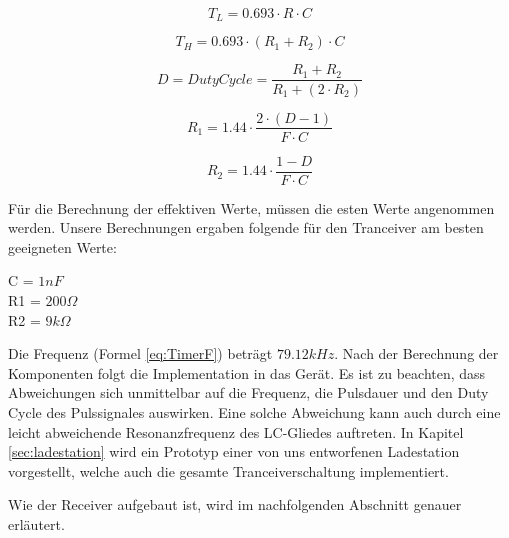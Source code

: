 \begin{equation}\label{eq:TimerTL}
T_{L}= 0.693\cdot R\cdot C
\end{equation}

\begin{equation}\label{eq:TimerTH}
T_{H}= 0.693\cdot (R_{1}+R_{2})\cdot C
\end{equation}

\begin{equation}\label{eq:TimerD}
D= Duty Cycle= \dfrac{R_{1}+R_{2}}{R_{1}+(2\cdot R_{2})}
\end{equation}

\begin{equation}\label{eq:TimerR1}
R_{1}= 1.44\cdot \frac{2\cdot (D-1)}{F\cdot C}
\end{equation}

\begin{equation}\label{eq:TimerR2}
R_{2}= 1.44\cdot \dfrac{1-D}{F\cdot C}
\end{equation}

Für die Berechnung der effektiven Werte, müssen die esten Werte angenommen werden. Unsere Berechnungen ergaben folgende für den Tranceiver am besten geeigneten Werte:

\begin{center}
C = $1nF$\\
R1 = $200\Omega$\\
R2 = $9k\Omega$\\
\end{center}
 
Die Frequenz (Formel \ref{eq:TimerF}) beträgt  $79.12kHz$. Nach der Berechnung der Komponenten folgt die Implementation in das Gerät. Es ist zu beachten, dass Abweichungen sich unmittelbar auf die Frequenz, die Pulsdauer und den Duty Cycle des Pulssignales auswirken. Eine solche Abweichung kann auch durch eine leicht abweichende Resonanzfrequenz des LC-Gliedes auftreten. In Kapitel \ref{sec:ladestation} wird ein Prototyp einer von uns entworfenen Ladestation vorgestellt, welche auch die gesamte Tranceiverschaltung implementiert.

Wie der Receiver aufgebaut ist, wird im nachfolgenden Abschnitt genauer erläutert.

